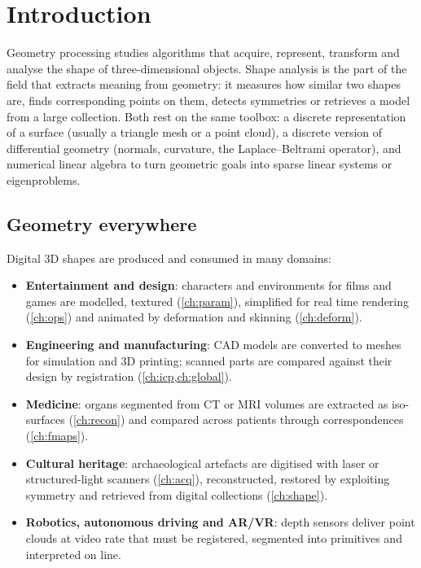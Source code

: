 \chapter{Introduction}\label{ch:intro}

Geometry processing studies algorithms that acquire, represent, transform and analyse the shape
of three-dimensional objects. Shape analysis is the part of the field that extracts meaning from
geometry: it measures how similar two shapes are, finds corresponding points on them, detects
symmetries or retrieves a model from a large collection. Both rest on the same toolbox: a
discrete representation of a surface (usually a triangle mesh or a point cloud), a discrete
version of differential geometry (normals, curvature, the Laplace--Beltrami operator), and
numerical linear algebra to turn geometric goals into sparse linear systems or eigenproblems.

\section{Geometry everywhere}

Digital 3D shapes are produced and consumed in many domains:
\begin{itemize}
  \item \textbf{Entertainment and design}: characters and environments for films and games are
  modelled, textured (\cref{ch:param}), simplified for real time rendering (\cref{ch:ops}) and
  animated by deformation and skinning (\cref{ch:deform}).
  \item \textbf{Engineering and manufacturing}: CAD models are converted to meshes for
  simulation and 3D printing; scanned parts are compared against their design by registration
  (\cref{ch:icp,ch:global}).
  \item \textbf{Medicine}: organs segmented from CT or MRI volumes are extracted as iso-surfaces
  (\cref{ch:recon}) and compared across patients through correspondences (\cref{ch:fmaps}).
  \item \textbf{Cultural heritage}: archaeological artefacts are digitised with laser or
  structured-light scanners (\cref{ch:acq}), reconstructed, restored by exploiting symmetry and
  retrieved from digital collections (\cref{ch:shape}).
  \item \textbf{Robotics, autonomous driving and AR/VR}: depth sensors deliver point clouds at
  video rate that must be registered, segmented into primitives and interpreted on line.
\end{itemize}

